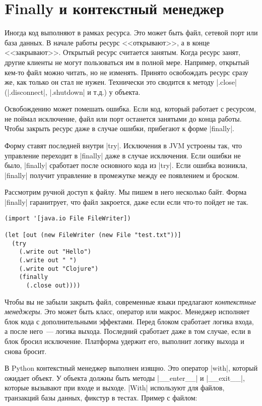 \section{Finally и контекстный менеджер}

Иногда код выполняют в рамках ресурса. Это может быть файл, сетевой порт или
база данных. В начале работы ресурс <<открывают>>, а в конце
<<закрывают>>. Открытый ресурс считается занятым. Когда ресурс занят, другие
клиенты не могут пользоваться им в полной мере. Например, открытый кем-то файл
можно читать, но не изменять. Принято освобождать ресурс сразу же, как только он
стал не нужен. Технически это сводится к методу \spverb|.close|
(\spverb|.disconnect|, \spverb|.shutdown| и т.д.) у объекта.

Освобождению может помешать ошибка. Если код, который работает с ресурсом, не
поймал исключение, файл или порт останется занятыми до конца работы. Чтобы
закрыть ресурс даже в случае ошибки, прибегают к форме \spverb|finally|.

Форму ставят последней внутри \spverb|try|. Исключения в JVM устроены так, что
управление переходит в \spverb|finally| даже в случае исключения. Если ошибки не
было, \spverb|finally| сработает после основного кода из \spverb|try|. Если
ошибка возникла, \spverb|finally| получит управление в промежутке между ее
появлением и броском.

Рассмотрим ручной доступ к файлу. Мы пишем в него несколько байт. Форма
\spverb|finally| гаранитрует, что файл закроется, даже если если что-то пойдет
не так.

\begin{verbatim}
(import '[java.io File FileWriter])

(let [out (new FileWriter (new File "test.txt"))]
  (try
    (.write out "Hello")
    (.write out " ")
    (.write out "Clojure")
    (finally
      (.close out))))
\end{verbatim}

Чтобы вы не забыли закрыть файл, современные языки предлагают \emph{контекстные
  менеджеры}. Это может быть класс, оператор или макрос. Менеджер исполняет блок
кода с дополнительными эффектами. Перед блоком сработает логика входа, а после
него~--- логика выхода. Последний сработает даже в том случае, если в блок
бросил исключение. Платформа удержит его, выполнит логику выхода и снова бросит.

В Python контекстный менеджер выполнен изящно. Это оператор \spverb|with|,
который ожидает объект. У объекта должны быть методы \spverb|__enter__| и
\spverb|__exit__|, которые вызывают при входе и выходе. \spverb|With| используют
для файлов, транзакций базы данных, фикстур в тестах. Пример с файлом:

